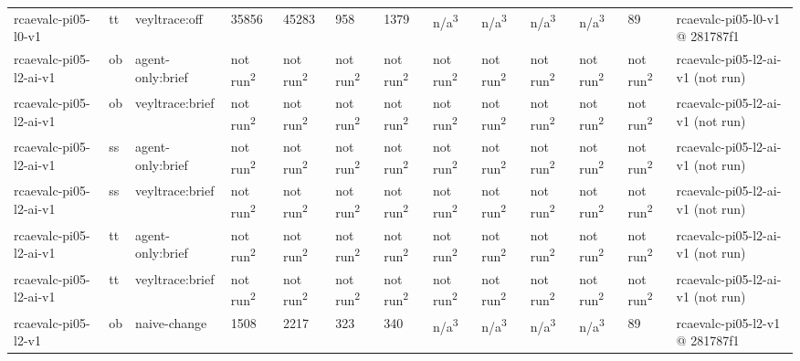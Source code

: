 \begin{table}[t]
\begin{tabular}{lllllllllllll}
rcaevalc-pi05-l0-v1 & tt & veyltrace:off & 35856 & 45283 & 958 & 1379 & n/a\textsuperscript{3} & n/a\textsuperscript{3} & n/a\textsuperscript{3} & n/a\textsuperscript{3} & 89 & rcaevalc-pi05-l0-v1 @ 281787f1 \\
rcaevalc-pi05-l2-ai-v1 & ob & agent-only:brief & not run\textsuperscript{2} & not run\textsuperscript{2} & not run\textsuperscript{2} & not run\textsuperscript{2} & not run\textsuperscript{2} & not run\textsuperscript{2} & not run\textsuperscript{2} & not run\textsuperscript{2} & not run\textsuperscript{2} & rcaevalc-pi05-l2-ai-v1 (not run) \\
rcaevalc-pi05-l2-ai-v1 & ob & veyltrace:brief & not run\textsuperscript{2} & not run\textsuperscript{2} & not run\textsuperscript{2} & not run\textsuperscript{2} & not run\textsuperscript{2} & not run\textsuperscript{2} & not run\textsuperscript{2} & not run\textsuperscript{2} & not run\textsuperscript{2} & rcaevalc-pi05-l2-ai-v1 (not run) \\
rcaevalc-pi05-l2-ai-v1 & ss & agent-only:brief & not run\textsuperscript{2} & not run\textsuperscript{2} & not run\textsuperscript{2} & not run\textsuperscript{2} & not run\textsuperscript{2} & not run\textsuperscript{2} & not run\textsuperscript{2} & not run\textsuperscript{2} & not run\textsuperscript{2} & rcaevalc-pi05-l2-ai-v1 (not run) \\
rcaevalc-pi05-l2-ai-v1 & ss & veyltrace:brief & not run\textsuperscript{2} & not run\textsuperscript{2} & not run\textsuperscript{2} & not run\textsuperscript{2} & not run\textsuperscript{2} & not run\textsuperscript{2} & not run\textsuperscript{2} & not run\textsuperscript{2} & not run\textsuperscript{2} & rcaevalc-pi05-l2-ai-v1 (not run) \\
rcaevalc-pi05-l2-ai-v1 & tt & agent-only:brief & not run\textsuperscript{2} & not run\textsuperscript{2} & not run\textsuperscript{2} & not run\textsuperscript{2} & not run\textsuperscript{2} & not run\textsuperscript{2} & not run\textsuperscript{2} & not run\textsuperscript{2} & not run\textsuperscript{2} & rcaevalc-pi05-l2-ai-v1 (not run) \\
rcaevalc-pi05-l2-ai-v1 & tt & veyltrace:brief & not run\textsuperscript{2} & not run\textsuperscript{2} & not run\textsuperscript{2} & not run\textsuperscript{2} & not run\textsuperscript{2} & not run\textsuperscript{2} & not run\textsuperscript{2} & not run\textsuperscript{2} & not run\textsuperscript{2} & rcaevalc-pi05-l2-ai-v1 (not run) \\
rcaevalc-pi05-l2-v1 & ob & naive-change & 1508 & 2217 & 323 & 340 & n/a\textsuperscript{3} & n/a\textsuperscript{3} & n/a\textsuperscript{3} & n/a\textsuperscript{3} & 89 & rcaevalc-pi05-l2-v1 @ 281787f1 \\

\end{tabular}
\end{table}
